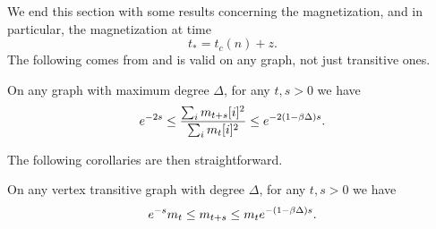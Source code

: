 
We end this section with some results concerning the magnetization, and in particular, the magnetization at time
\begin{equation}
\label{eq: define t star general graphs}
	t_* = t_c(n) + z.
\end{equation}
The following comes from \cite{Lubetzky2017-nc} and is valid on any graph, not just transitive ones.
\begin{lemma}
\label{lemma: exponential decay magnetization}
	On any graph with maximum degree $\Delta$, for any $t, s > 0$ we have
	\begin{equation}
		e^{-2s} \leq \frac{\sum_i m_{t+s}[i]^2}{\sum_i m_t[i]^2} \leq e^{-2(1 - \beta \Delta)s}.
	\end{equation}
\end{lemma}
The following corollaries are then straightforward.
\begin{corollary}
	\label{cor:exponential decay magnetization}
	On any vertex transitive graph with degree $\Delta$, for any $t, s > 0$ we have
	\begin{equation}
		e^{-s} m_t \leq m_{t+s} \leq m_t e^{-(1 - \beta \Delta)s}.
	\end{equation}
\end{corollary}



